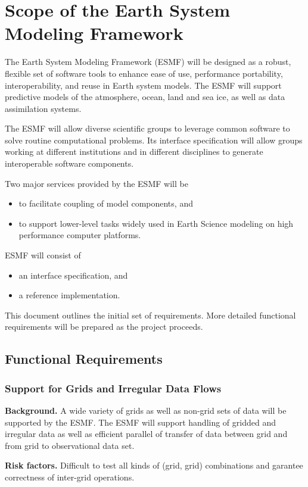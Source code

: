 \section{Scope of the Earth System Modeling Framework}

The Earth System Modeling Framework (ESMF) will be designed as a robust, 
flexible set of software tools to enhance ease of use, performance 
portability, interoperability, and reuse in Earth system models. The ESMF 
will support predictive models of the atmosphere, ocean, land and sea ice, 
as well as data assimilation systems.

The ESMF will allow diverse scientific groups to leverage common software to 
solve routine computational problems. Its interface specification will allow 
groups working at different institutions and in different disciplines to
generate interoperable software components.  

Two major services provided by the ESMF will be
\begin{itemize}
\item to facilitate coupling of model components, and 
\item to support lower-level tasks widely used in Earth Science modeling on 
high performance computer platforms. 
\end{itemize}
ESMF will consist of 
\begin{itemize}
\item an interface specification, and 
\item a reference implementation.
\end{itemize}
This document outlines the initial set of requirements. More detailed 
functional requirements will be prepared as the project proceeds.

\subsection{Functional Requirements}



\subsubsection{Support for Grids and Irregular Data Flows}




\begin{reqlist}
{\bf Background.} 
A wide variety of grids as well as non-grid sets of data will be supported by 
the ESMF. The ESMF will support handling of gridded and irregular data as 
well as efficient parallel of transfer of data between grid and from grid to 
observational data set.

{\bf Risk factors.} Difficult to test all kinds of (grid, grid) combinations 
and garantee correctness of inter-grid operations.
\end{reqlist}

